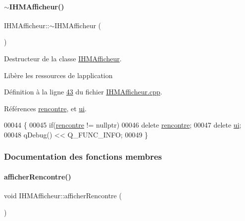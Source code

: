 \paragraph{\texorpdfstring{$\sim$\+I\+H\+M\+Afficheur()}{~IHMAfficheur()}}
{\footnotesize\ttfamily I\+H\+M\+Afficheur\+::$\sim$\+I\+H\+M\+Afficheur (\begin{DoxyParamCaption}{ }\end{DoxyParamCaption})}



Destructeur de la classe \hyperlink{class_i_h_m_afficheur}{I\+H\+M\+Afficheur}. 

Libère les ressources de l\textquotesingle{}application 

Définition à la ligne \hyperlink{_i_h_m_afficheur_8cpp_source_l00043}{43} du fichier \hyperlink{_i_h_m_afficheur_8cpp_source}{I\+H\+M\+Afficheur.\+cpp}.



Références \hyperlink{_i_h_m_afficheur_8h_source_l00040}{rencontre}, et \hyperlink{_i_h_m_afficheur_8h_source_l00039}{ui}.


\begin{DoxyCode}
00044 \{
00045     \textcolor{keywordflow}{if}(\hyperlink{class_i_h_m_afficheur_aef34d340f7ea30f049a98efc47bd9779}{rencontre} != \textcolor{keyword}{nullptr})
00046         \textcolor{keyword}{delete} \hyperlink{class_i_h_m_afficheur_aef34d340f7ea30f049a98efc47bd9779}{rencontre};
00047     \textcolor{keyword}{delete} \hyperlink{class_i_h_m_afficheur_a26ca43f1ff87b1caa2191adcce444d23}{ui};
00048     qDebug() << Q\_FUNC\_INFO;
00049 \}
\end{DoxyCode}


\subsubsection{Documentation des fonctions membres}
\mbox{\label{class_i_h_m_afficheur_aec1fee14a130ea53206bf5f8e532b819}} 
\paragraph{\texorpdfstring{afficher\+Rencontre()}{afficherRencontre()}}
{\footnotesize\ttfamily void I\+H\+M\+Afficheur\+::afficher\+Rencontre (\begin{DoxyParamCaption}{ }\end{DoxyParamCaption})\hspace{0.3cm}{\ttfamily [private]}}



